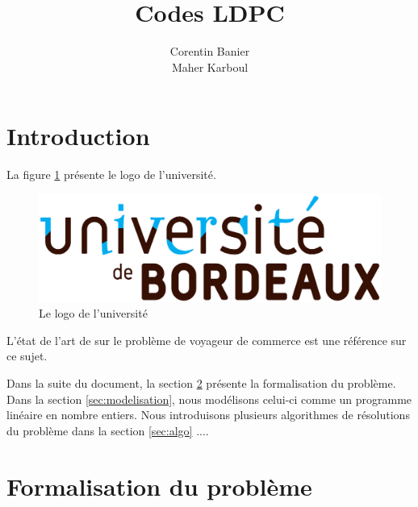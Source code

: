 \documentclass[french,nochapter,11pt]{rapportUB}
\author{ %
  Corentin Banier
  \\
  Maher Karboul
}
\begin{document}
\title{Codes LDPC}

\maketitle

\begin{center}
\tableofcontents %
\clearpage
\end{center}



\section{Introduction}
\label{sec:introduction}


La figure
\ref{fig:logo} présente le logo de l'université.

\begin{figure}[!h]
\centering
\includegraphics[scale=0.1]{logo.eps}  
\caption{Le logo de l'université}
\label{fig:logo}
\end{figure}


L'état de l'art de
\textcite{Applegate2006} sur le problème de voyageur de commerce est une référence sur ce sujet.

\vspace{0.8cm}
Dans la suite du document, la section \ref{sec:formalisation} présente la formalisation du problème. Dans la section \ref{sec:modelisation}, nous modélisons celui-ci comme un programme linéaire en nombre entiers. Nous introduisons plusieurs algorithmes de résolutions du problème dans la section \ref{sec:algo} ....


\section{Formalisation du problème}
\label{sec:formalisation}
\end{document}
